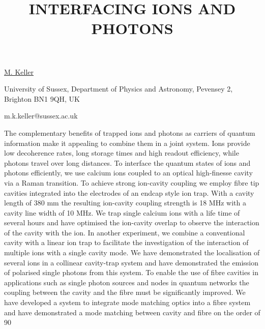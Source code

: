 \title{INTERFACING IONS AND PHOTONS}

\underline{M. Keller} 

{\normalsize{\vspace{-4mm}
University of Sussex,
Department of Physics and Astronomy,
Pevensey 2,
Brighton BN1 9QH,
UK

\email m.k.keller@sussex.ac.uk}}

The complementary benefits of trapped ions and photons as carriers of quantum information make it appealing to combine them in a joint system. Ions provide low decoherence rates, long storage times and high readout efficiency, while photons travel over long distances. To interface the quantum states of ions and photons efficiently, we use calcium ions coupled to an optical high-finesse cavity via a Raman transition.
To achieve strong ion-cavity coupling we employ fibre tip cavities integrated into the electrodes of an endcap style ion trap. With a cavity length of 380 mm the resulting ion-cavity coupling strength is 18 MHz with a cavity line width of 10 MHz. We trap single calcium ions with a life time of several hours and have optimised the ion-cavity overlap to observe the interaction of the cavity with the ion.
In another experiment, we combine a conventional cavity with a linear ion trap to facilitate the investigation of the interaction of multiple ions with a single cavity mode. We have demonstrated the localisation of several ions in a collinear cavity-trap system and have demonstrated the emission of polarised single photons from this system.
To enable the use of fibre cavities in applications such as single photon sources and nodes in quantum networks the coupling between the cavity and the fibre must be significantly improved. We have developed a system to integrate mode matching optics into a fibre system and have demonstrated a mode matching between cavity and fibre on the order of 90%


\vspace{\baselineskip} 